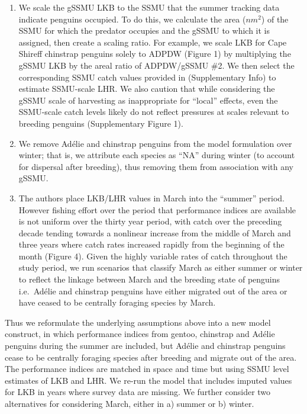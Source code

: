 \documentclass[]{elsarticle} %
\providecommand{\tightlist}{%
  \setlength{\itemsep}{0pt}\setlength{\parskip}{0pt}}
\begin{document}
\begin{enumerate}
\def\labelenumi{\arabic{enumi}.}
\tightlist
\item
  We scale the gSSMU LKB to the SSMU that the summer tracking data
  indicate penguins occupied. To do this, we calculate the area
  (\(nm^2\)) of the SSMU for which the predator occupies and the gSSMU
  to which it is assigned, then create a scaling ratio. For example, we
  scale LKB for Cape Shireff chinstrap penguins solely to ADPDW (Figure
  1) by multiplying the gSSMU LKB by the areal ratio of ADPDW/gSSMU \#2.
  We then select the corresponding SSMU catch values provided in
  \citet{Watters2020} (Supplementary Info) to estimate SSMU-scale LHR.
  We also caution that while considering the gSSMU scale of harvesting
  as inappropriate for ``local'' effects, even the SSMU-scale catch
  levels likely do not reflect pressures at scales relevant to breeding
  penguins (Supplementary Figure 1).\\
\item
  We remove Adélie and chinstrap penguins from the model formulation
  over winter; that is, we attribute each species as ``NA'' during
  winter (to account for dispersal after breeding), thus removing them
  from association with any gSSMU.\\
\item
  The authors place LKB/LHR values in March into the ``summer'' period.
  However fishing effort over the period that performance indices are
  available is not uniform over the thirty year period, with catch over
  the preceding decade tending towards a nonlinear increase from the
  middle of March and three years where catch rates increased rapidly
  from the beginning of the month (Figure 4). Given the highly variable
  rates of catch throughout the study period, we run scenarios that
  classify March as either summer or winter to reflect the linkage
  between March and the breeding state of penguins i.e.~Adélie and
  chinstrap penguins have either migrated out of the area or have ceased
  to be centrally foraging species by March.
\end{enumerate}

Thus we reformulate the underlying assumptions above into a new model
construct, in which performance indices from gentoo, chinstrap and
Adélie penguins during the summer are included, but Adélie and chinstrap
penguins cease to be centrally foraging species after breeding and
migrate out of the area. The performance indices are matched in space
and time but using SSMU level estimates of LKB and LHR. We re-run the
model that includes imputed values for LKB in years where survey data
are missing. We further consider two alternatives for considering March,
either in a) summer or b) winter.
\end{document}
